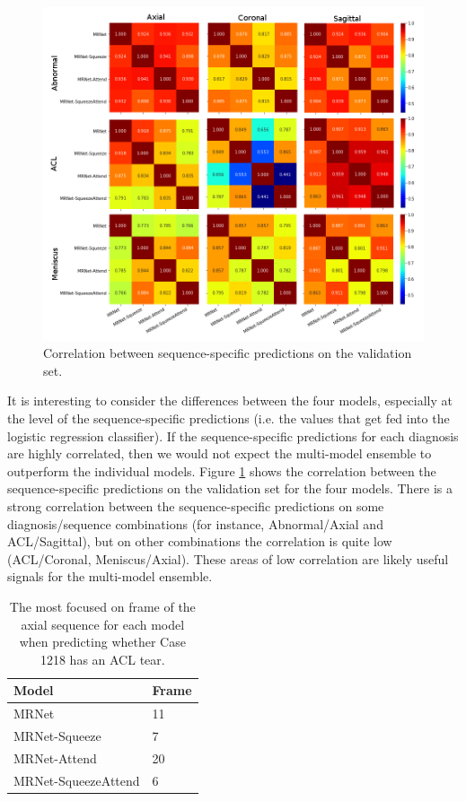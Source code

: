 \documentclass[10pt,twocolumn,letterpaper]{article}
\begin{document}
\begin{figure}[h!]
\begin{center}
\includegraphics[width=0.9\linewidth]{../images/corr2/corr2.png}
\end{center}
   \caption{Correlation between sequence-specific predictions on the validation set.}
\label{fig:corr}
\end{figure}



It is interesting to consider the differences between the four models, especially at the level of the sequence-specific predictions (i.e. the values that get fed into the logistic regression classifier). If the sequence-specific predictions for each diagnosis are highly correlated, then we would not expect the multi-model ensemble to outperform the individual models. Figure \ref{fig:corr} shows the correlation between the sequence-specific predictions on the validation set for the four models. There is a strong correlation between the sequence-specific predictions on some diagnosis/sequence combinations (for instance, Abnormal/Axial and ACL/Sagittal), but on other combinations the correlation is quite low (ACL/Coronal, Meniscus/Axial). These areas of low correlation are likely useful signals for the multi-model ensemble.

\begin{table}[h!]
\begin{center}
\begin{tabular}{|l|l|}
\hline
Model & Frame \\
\hline
MRNet & 11 \\
MRNet-Squeeze & 7 \\
MRNet-Attend & 20 \\
MRNet-SqueezeAttend & 6 \\
\hline
\end{tabular}
\end{center}
\caption{The most focused on frame of the axial sequence for each model when predicting whether Case 1218 has an ACL tear.}
\label{tab:frames}
\end{table}
\end{document}
